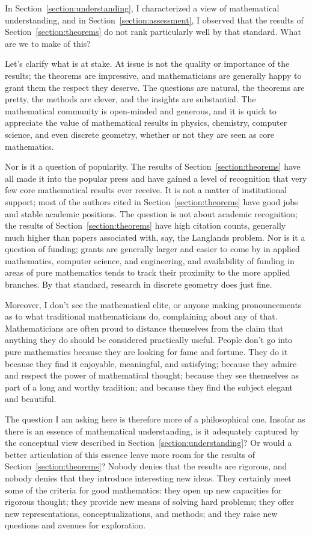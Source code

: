 \documentclass[12pt]{amsart}
\theoremstyle{definition}
\theoremstyle{remark}
\numberwithin{equation}{section}
\begin{document}
In Section~\ref{section:understanding}, I characterized a view of mathematical understanding, and in Section~\ref{section:assessment}, I observed that the results of Section~\ref{section:theorems} do not rank particularly well by that standard. What are we to make of this?

Let's clarify what is at stake. At issue is not the quality or importance of the results; the theorems are impressive, and mathematicians are generally happy to grant them the respect they deserve. The questions are natural, the theorems are pretty, the methods are clever, and the insights are substantial. The mathematical community is open-minded and generous, and it is quick to appreciate the value of mathematical results in physics, chemistry, computer science, and even discrete geometry, whether or not they are seen as core mathematics.

Nor is it a question of popularity. The results of Section~\ref{section:theorems} have all made it into the popular press and have gained a level of recognition that very few core mathematical results ever receive. It is not a matter of institutional support; most of the authors cited in Section~\ref{section:theorems} have good jobs and stable academic positions. The question is not about academic recognition; the results of Section~\ref{section:theorems} have high citation counts, generally much higher than papers associated with, say, the Langlands problem. Nor is it a question of funding; grants are generally larger and easier to come by in applied mathematics, computer science, and engineering, and availability of funding in areas of pure mathematics tends to track their proximity to the more applied branches. By that standard, research in discrete geometry does just fine.

Moreover, I don't see the mathematical elite, or anyone making pronouncements as to what traditional mathematicians do, complaining about any of that. Mathematicians are often proud to distance themselves from the claim that anything they do should be considered practically useful. People don't go into pure mathematics because they are looking for fame and fortune. They do it because they find it enjoyable, meaningful, and satisfying; because they admire and respect the power of mathematical thought; because they see themselves as part of a long and worthy tradition; and because they find the subject elegant and beautiful.

The question I am asking here is therefore more of a philosophical one. Insofar as there is an essence of mathematical understanding, is it adequately captured by the conceptual view described in Section~\ref{section:understanding}? Or would a better articulation of this essence leave more room for the results of Section~\ref{section:theorems}? Nobody denies that the results are rigorous, and nobody denies that they introduce interesting new ideas. They certainly meet some of the criteria for good mathematics: they open up new capacities for rigorous thought; they provide new means of solving hard problems; they offer new representations, conceptualizations, and methods; and they raise new questions and avenues for exploration.
\end{document}
